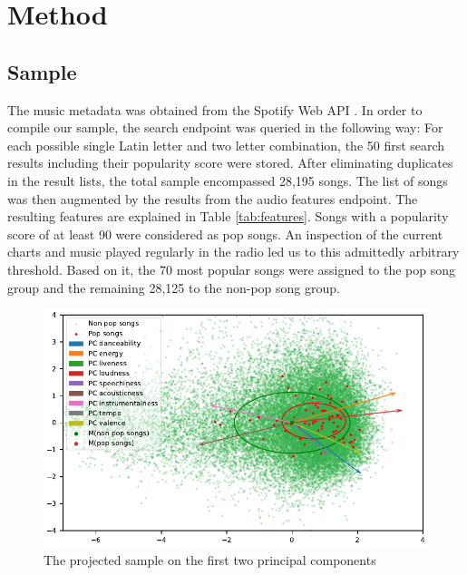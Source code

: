\documentclass{article}
\begin{document}
\section{Method}


\subsection{Sample}
The music metadata was obtained from the Spotify Web API \citep{spotifyAPIdocu}.
In order to compile our sample, the search endpoint was queried in the following way: For each possible single Latin letter and two letter combination, the 50 first search results including their popularity score were stored. After eliminating duplicates in the result lists, the total sample encompassed 28,195 songs. The list of songs was then augmented by the results from the audio features endpoint.
The resulting features are explained in Table \ref{tab:features}. Songs with a popularity score of at least 90 were considered as pop songs. An inspection of the current charts and music played regularly in the radio led us to this admittedly arbitrary threshold. Based on it, the 70 most popular songs were assigned to the pop song group and the remaining 28,125 to the non-pop song group.

\begin{figure}
  \centering
  \includegraphics[]{../fig/001_pca.pdf}
  \caption{The projected sample on the first two principal components}
  \label{fig:pca}
\end{figure}
\end{document}
